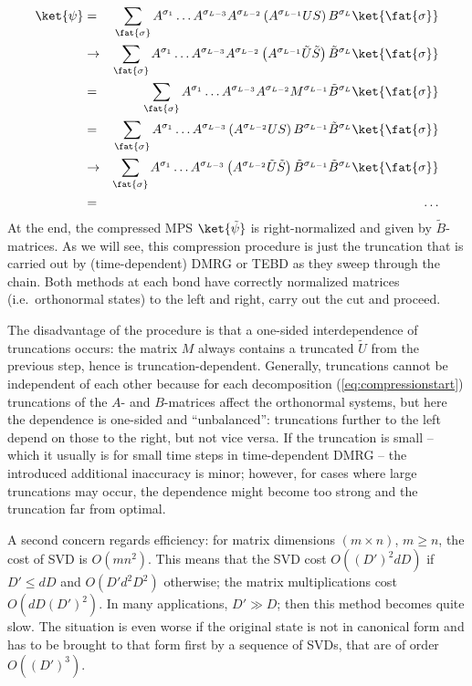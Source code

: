 \begin{eqnarray*}
\ket{\psi} &=& \sum_{\fat{\sigma}}  A^{\sigma_1} \ldots A^{\sigma_{L-3}}A^{\sigma_{L-2}} \left( A^{\sigma_{L-1}} U S \right)B^{\sigma_L}   \ket{\fat{\sigma}} \\
&\rightarrow& \sum_{\fat{\sigma}} A^{\sigma_1} \ldots A^{\sigma_{L-3}}A^{\sigma_{L-2}}\left( A^{\sigma_{L-1}} \tilde{U} \tilde{S} \right) \tilde{B}^{\sigma_L}   \ket{\fat{\sigma}} \\
&=&  \sum_{\fat{\sigma}} A^{\sigma_1} \ldots A^{\sigma_{L-3}}A^{\sigma_{L-2}} M^{\sigma_{L-1}} \tilde{B}^{\sigma_L}   \ket{\fat{\sigma}} \\
&=& \sum_{\fat{\sigma}} A^{\sigma_1} \ldots A^{\sigma_{L-3}} \left( A^{\sigma_{L-2}} U S \right) B^{\sigma_{L-1}} \tilde{B}^{\sigma_L}   \ket{\fat{\sigma}} \\
&\rightarrow& \sum_{\fat{\sigma}} A^{\sigma_1} \ldots A^{\sigma_{L-3}} \left( A^{\sigma_{L-2}} \tilde{U} \tilde{S} \right) \tilde{B}^{\sigma_{L-1}} \tilde{B}^{\sigma_L}   \ket{\fat{\sigma}} \\
&=& \ldots
\end{eqnarray*}
At the end, the compressed MPS $\ket{\tilde{\psi}}$ is right-normalized and given by $\tilde{B}$-matrices. As we will see, this compression procedure is just the truncation that is carried out by (time-dependent) DMRG or TEBD as they sweep through the chain. Both methods at each bond have correctly normalized matrices (i.e.\ orthonormal states) to the left and right, carry out the cut and proceed.

The disadvantage of the procedure is that a one-sided interdependence of truncations occurs: the matrix $M$ always contains a truncated $\tilde{U}$ from the previous step, hence is truncation-dependent. Generally, truncations cannot be independent of each other because for each decomposition (\ref{eq:compressionstart}) truncations of the $A$- and $B$-matrices affect the orthonormal systems, but here the dependence is one-sided and ``unbalanced'': truncations further to the left depend on those to the right, but not vice versa. If the truncation is small -- which it usually is for small time steps in time-dependent DMRG -- the introduced additional inaccuracy is minor; however, for cases where large truncations may occur, the dependence might become too strong and the truncation far from optimal. 

A second concern regards efficiency: for matrix dimensions $(m\times n)$, $m\ge n$, the cost of SVD is $O(m n^2)$. This means that the SVD cost $O((D')^2 dD)$ if $D' \le dD$ and $O(D' d^2 D^2)$ otherwise; the matrix multiplications cost $O(dD(D')^2)$. In many applications, $D'\gg D$; then this method becomes quite slow. The situation is even worse if the original state is not in canonical form and has to be brought to that form first by a sequence of SVDs, that are of order $O((D')^3)$.

